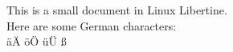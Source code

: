\documentclass{article}
\begin{document}
This is a small document in Linux Libertine.
\\
Here are some German characters:
\\
äÄ öÖ üÜ ß
\end{document}

